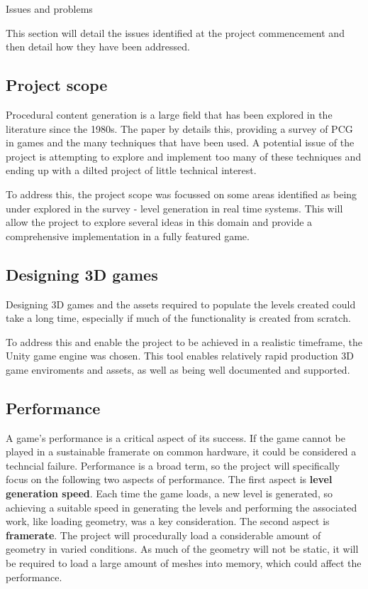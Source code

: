 \documentclass[progress]{cmpreport}
\begin{document}
\begin{section}{Issues and problems}

This section will detail the issues identified at the project commencement and then detail how they have been addressed.

\subsection{Project scope}
Procedural content generation is a large field that has been explored in the literature since the 1980s. The paper by \cite{Hendrikx:2013:PCG:2422956.2422957} details this, providing a survey of PCG in games and the many techniques that have been used. A potential issue of the project is attempting to explore and implement too many of these techniques and ending up with a dilted project of little technical interest. 

To address this, the project scope was focussed on some areas identified as being under explored in the survey - level generation in real time systems. This will allow the project to explore several ideas in this domain and provide a comprehensive implementation in a fully featured game.

\subsection{Designing 3D games}
Designing 3D games and the assets required to populate the levels created could take a long time, especially if much of the functionality is created from scratch. 

To address this and enable the project to be achieved in a realistic timeframe, the Unity game engine was chosen. This tool enables relatively rapid production 3D game enviroments and assets, as well as being well documented and supported.

\subsection{Performance}
A game's performance is a critical aspect of its success. If the game cannot be played in a sustainable framerate on common hardware, it could be considered a techncial failure. Performance is a broad term, so the project will specifically focus on the following two aspects of performance. The first aspect is \textbf{level generation speed}. Each time the game loads, a new level is generated, so achieving a suitable speed in generating the levels and performing the associated work, like loading geometry, was a key consideration. The second aspect is \textbf{framerate}. The project will procedurally load a considerable amount of geometry in varied conditions. As much of the geometry will not be static, it will be required to load a large amount of meshes into memory, which could affect the performance.  


\end{section}
\end{document}

